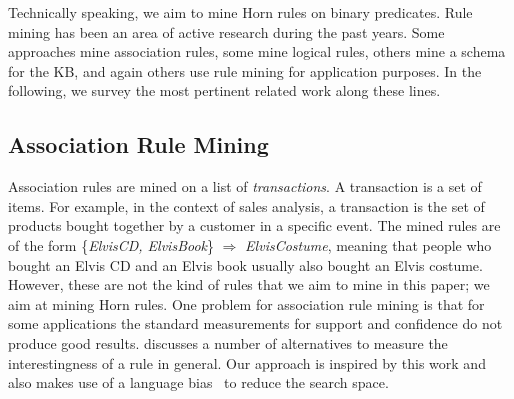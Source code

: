 Technically speaking, we aim to mine Horn rules on binary predicates. 
Rule mining has been an area of active research during the past years. 
Some approaches mine association rules, some mine logical rules, others mine a schema for the KB, and again others use rule mining for application purposes.
In the following, we survey the most pertinent related work along these lines.
\subsection{Association Rule Mining} 
Association rules \cite{AgrImiSwa93} are mined on a list of \emph{transactions}. A transaction is a set of items. 
For example, in the context of sales analysis, a transaction is the set of products bought together by a customer in a specific event. 
The mined rules are of the form \{\emph{ElvisCD, ElvisBook}\} $\Rightarrow$ \emph{ElvisCostume}, meaning that people who bought an Elvis CD and an Elvis book usually also bought an Elvis costume. 
However, these are not the kind of rules that we aim to mine in this paper; we aim at mining Horn rules. %
One problem for association rule mining is that for some applications the standard measurements for support and confidence do not produce good results. 
\cite{TanKumSri02} discusses a number of alternatives to measure the interestingness of a rule in general. 
Our approach is inspired by this work and also makes use of a language bias~\cite{AdeRaeBru95} to reduce the search space. %

